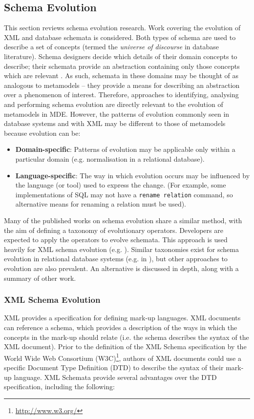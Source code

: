 \subsection{Schema Evolution}
\label{subsec:schema_evolution}
This section reviews schema evolution research. Work covering the evolution of XML and database schemata is considered. Both types of schema are used to describe a set of concepts (termed the \textit{universe of discourse} in database literature). Schema designers decide which details of their domain concepts to describe; their schemata provide an abstraction containing only those concepts which are relevant \cite[pg. 30]{elmasri06database}. As such, schemata in these domains may be thought of as analogous to metamodels -- they provide a means for describing an abstraction over a phenomenon of interest. Therefore, approaches to identifying, analysing and performing schema evolution are directly relevant to the evolution of metamodels in MDE. However, the patterns of evolution commonly seen in database systems and with XML may be different to those of metamodels because evolution can be:

\begin{itemize}
 \item \textbf{Domain-specific}: Patterns of evolution may be applicable only within a particular domain (e.g. normalisation in a relational database).
 \item \textbf{Language-specific}: The way in which evolution occurs may be influenced by the language (or tool) used to express the change. (For example, some implementations of SQL may not have a \texttt{rename relation} command, so alternative means for renaming a relation must be used).
\end{itemize}

Many of the published works on schema evolution share a similar method, with the aim of defining a taxonomy of evolutionary operators. Developers are expected to apply the operators to evolve schemata. This approach is used heavily for XML schema evolution (e.g. \cite{guerrini05impact,kramer01xem,su01xem}). Similar taxonomies exist for schema evolution in relational database systems (e.g. in \cite{banerjee87semantics,edelweiss05temporal}), but other approaches to evolution are also prevalent. An alternative is discussed in depth, along with a summary of other work.


\subsubsection{XML Schema Evolution}
\label{LitReview:XmlSchemaEvo}
XML provides a specification for defining mark-up languages. XML documents can reference a schema, which provides a description of the ways in which the concepts in the mark-up should relate (i.e. the schema describes the syntax of the XML document). Prior to the definition of the XML Schema specification \cite{xmlschema} by the World Wide Web Consortium (W3C)\footnote{\url{http://www.w3.org/}}, authors of XML documents could use a specific Document Type Definition (DTD) to describe the syntax of their mark-up language. XML Schemata provide several advantages over the DTD specification, including the following:

